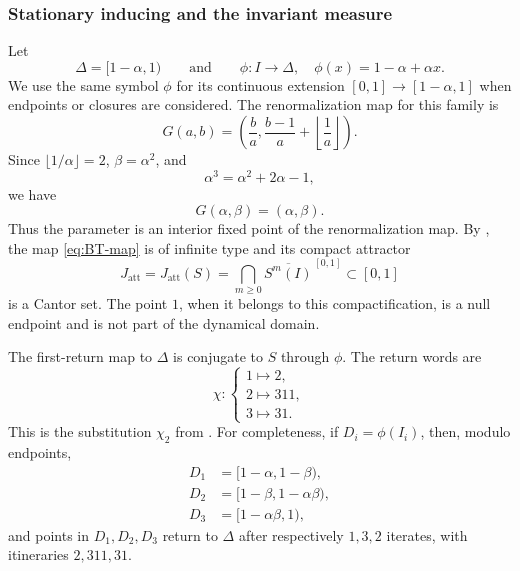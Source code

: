 \documentclass[11pt]{amsart}
\theoremstyle{plain}
\theoremstyle{definition}
\theoremstyle{remark}
\begin{document}
\subsubsection{Stationary inducing and the invariant measure}

Let
\[
        \Delta=[1-\alpha,1)
        \qquad\text{and}\qquad
        \phi:I\longrightarrow\Delta,
        \quad
        \phi(x)=1-\alpha+\alpha x.
\]
We use the same symbol \(\phi\) for its continuous extension
\([0,1]\to[1-\alpha,1]\) when endpoints or closures are considered.
The renormalization map for this family is
\[
G(a,b)=
\left(
\frac{b}{a},
\frac{b-1}{a}+\left\lfloor\frac1a\right\rfloor
\right).
\]
Since \(\lfloor1/\alpha\rfloor=2\), \(\beta=\alpha^2\), and
\[
        \alpha^3=\alpha^2+2\alpha-1,
\]
we have
\[
        G(\alpha,\beta)=(\alpha,\beta).
\]
Thus the parameter is an interior fixed point of the renormalization map. By
\cite[Corollary~5]{BruinTroubetzkoy2003}, the map \eqref{eq:BT-map} is of infinite type and
its compact attractor
\[
        J_{\mathrm{att}}
        =
        J_{\mathrm{att}}(S)
        =
        \bigcap_{m\geq0}\overline{S^m(I)}^{\,[0,1]}
        \subset[0,1]
\]
is a Cantor set.  The point \(1\), when it belongs to this compactification, is a null
endpoint and is not part of the dynamical domain.

The first-return map to \(\Delta\) is conjugate to \(S\) through \(\phi\). The return words
are
\[
\chi:
\begin{cases}
1\longmapsto2,\\
2\longmapsto311,\\
3\longmapsto31.
\end{cases}
\tag{8.2}
\label{eq:BT-substitution}
\]
This is the substitution \(\chi_2\) from
\cite[Theorem~7]{BruinTroubetzkoy2003}. For completeness, if
\(D_i=\phi(I_i)\), then, modulo endpoints,
\[
\begin{aligned}
D_1&=[1-\alpha,1-\beta),\\
D_2&=[1-\beta,1-\alpha\beta),\\
D_3&=[1-\alpha\beta,1),
\end{aligned}
\]
and points in \(D_1,D_2,D_3\) return to \(\Delta\) after respectively
\(1,3,2\) iterates, with itineraries \(2,311,31\).
\end{document}
